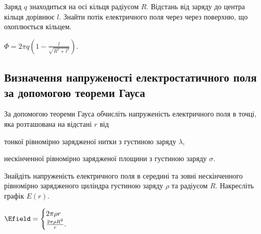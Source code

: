 
\begin{problem}
Заряд $q$ знаходиться на осі кільця радіусом $R$. Відстань від заряду до центра кільця дорівнює $l$. Знайти потік електричного поля через через поверхню, що охоплюється кільцем.
\begin{solution}
	$\Phi = 2\pi q\left( 1 - \frac{l}{\sqrt{R^2 + l^2}}\right) $.
\end{solution}
\end{problem}

\subsection*{Визначення напруженості електростатичного поля за допомогою теореми Гауса}

\begin{problem}
	За допомогою теореми Гауса обчисліть напруженість електричного поля в точці, яка розташована на відстані $r$ від 
\begin{enumerate*}[label=\alph*)]
\item тонкої рівномірно зарядженої нитки з густиною заряду $\lambda$,
\item нескінченної рівномірно зарядженої площини з густиною заряду $\sigma$.
\end{enumerate*}
\end{problem}

\begin{problem}
    Знайдіть напруженість електричного поля в середині та зовні нескінченного рівномірно зарядженого циліндра густиною заряду $\rho$ та радіусом $R$. Накресліть графік $E(r)$.
\begin{solution}
	$\Efield = 
		\begin{cases}
			2\pi\rho r\\
			\frac{2\pi\rho R^2}{r}.
		\end{cases}
	$
\end{solution}
\end{problem}

